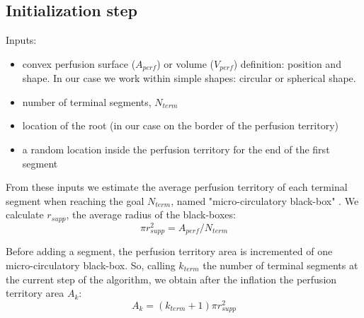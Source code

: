 \documentclass[a4paper, 11pt]{article} %
\begin{document}
\subsection{Initialization step}  
Inputs:
\begin{itemize}
\item convex perfusion surface ($A_{perf}$) or volume ($V_{perf}$) definition: position and shape. In our case we work within simple shapes: circular or spherical shape.
\item number of terminal segments, $N_{term}$
\item location of the root (in our case on the border of the perfusion territory)
\item a random location inside the perfusion territory for the end of the first segment 
\end{itemize}

From these inputs we estimate the average perfusion territory of each terminal segment when reaching the goal $N_{term}$, named "micro-circulatory black-box" \cite{schreiner1993computer}. We calculate $r_{supp}$, the average radius of the black-boxes:
\begin{equation}
\pi r_{supp}^2 = A_{perf} / N_{term}
\label{eq rsupp2D}
\end{equation}  

Before adding a segment, the perfusion territory area is incremented of one micro-circulatory black-box. So, calling $k_{term}$ the number of terminal segments at the current step of the algorithm, we obtain after the inflation the perfusion territory area $A_k$:
\begin{equation}
A_k = (k_{term} + 1) \pi r_{supp}^2
\end{equation}
\end{document}
